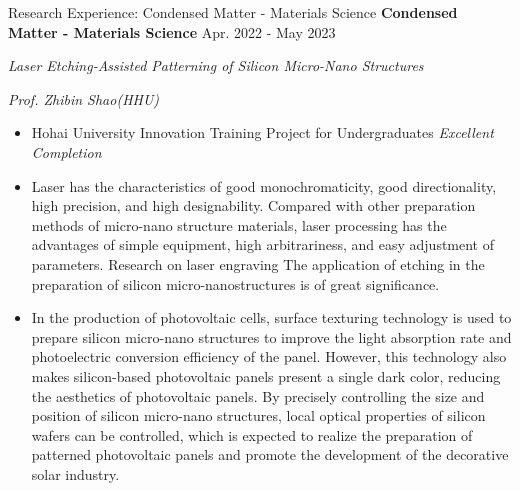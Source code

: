 \documentclass[9pt,aspectratio=169,hyperref=colorlinks]{beamer}
\begin{document}
\begin{frame}{Research Experience: Condensed Matter - Materials Science}
    \medskip \textbf{Condensed Matter - Materials Science} \hfill Apr. 2022 - May 2023

    \quad \textit{Laser Etching-Assisted Patterning of Silicon Micro-Nano Structures}

    \hfill \textit{Prof. Zhibin Shao(HHU)}

    \begin{itemize}
        \item Hohai University Innovation Training Project for Undergraduates \textit{Excellent Completion}
        \item Laser has the characteristics of good monochromaticity, good directionality, high precision, and high designability. Compared with other preparation methods of micro-nano structure materials, laser processing has the advantages of simple equipment, high arbitrariness, and easy adjustment of parameters. Research on laser engraving The application of etching in the preparation of silicon micro-nanostructures is of great significance.
        \item In the production of photovoltaic cells, surface texturing technology is used to prepare silicon micro-nano structures to improve the light absorption rate and photoelectric conversion efficiency of the panel. However, this technology also makes silicon-based photovoltaic panels present a single dark color, reducing the aesthetics of photovoltaic panels. By precisely controlling the size and position of silicon micro-nano structures, local optical properties of silicon wafers can be controlled, which is expected to realize the preparation of patterned photovoltaic panels and promote the development of the decorative solar industry.
    \end{itemize}
\end{frame}
\end{document}
